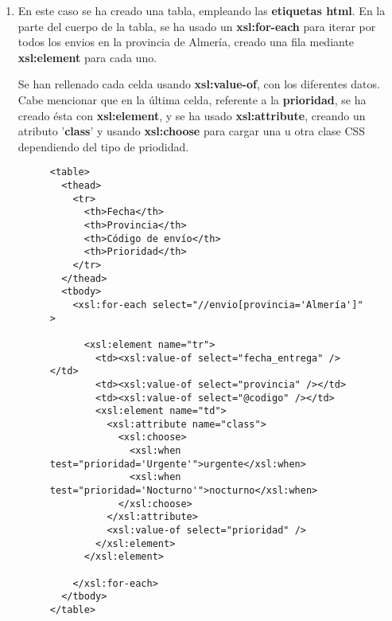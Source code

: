 \begin{enumerate}[label=\Alph*.]
    \item En este caso se ha creado una tabla, empleando las \textbf{etiquetas html}. En la parte
    del cuerpo de la tabla, se ha usado un \textbf{xsl:for-each} para iterar por todos los
    envios en la provincia de Almería, creado una fila mediante \textbf{xsl:element} para cada
    uno.

    Se han rellenado cada celda usando \textbf{xsl:value-of}, con los diferentes datos. Cabe mencionar
    que en la última celda, referente a la \textbf{prioridad}, se ha creado ésta con \textbf{xsl:element}, y se ha
    usado \textbf{xsl:attribute}, creando un atributo '\textbf{class}' y usando \textbf{xsl:choose} para cargar una u otra clase CSS dependiendo del tipo de priodidad.

    \begin{figure}[H]
        \begin{tcolorbox}[sharp corners, colback=yellow!30, colframe=white!20]
            \scriptsize
\begin{verbatim}
<table>
  <thead>
    <tr>
      <th>Fecha</th>
      <th>Provincia</th>
      <th>Código de envío</th>
      <th>Prioridad</th>
    </tr>
  </thead>
  <tbody>
    <xsl:for-each select="//envio[provincia='Almería']" >

      <xsl:element name="tr">
        <td><xsl:value-of select="fecha_entrega" /></td>
        <td><xsl:value-of select="provincia" /></td>
        <td><xsl:value-of select="@codigo" /></td>
        <xsl:element name="td">
          <xsl:attribute name="class">
            <xsl:choose>
              <xsl:when test="prioridad='Urgente'">urgente</xsl:when>
              <xsl:when test="prioridad='Nocturno'">nocturno</xsl:when>
            </xsl:choose>
          </xsl:attribute>
          <xsl:value-of select="prioridad" />
        </xsl:element>
      </xsl:element>

    </xsl:for-each>
  </tbody>
</table>
\end{verbatim}
        \end{tcolorbox}
    \end{figure}
\end{enumerate}







%
%


